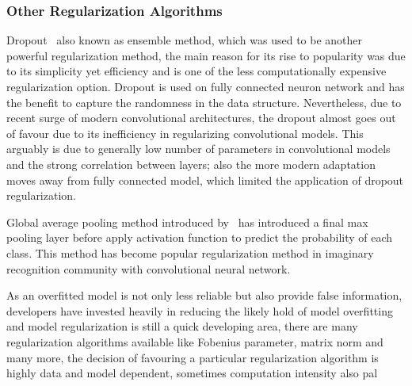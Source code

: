 \subsubsection{Other Regularization Algorithms}

Dropout~\cite{JMLR:v15:srivastava14a} also known as ensemble method, which was used to be another powerful regularization method, the main reason for its rise to popularity was due to its simplicity yet efficiency and is one of the less computationally expensive regularization option. Dropout is used on fully connected neuron network and has the benefit to capture the randomness in the data structure. Nevertheless, due to recent surge of modern convolutional architectures, the dropout almost goes out of favour due to its inefficiency in regularizing convolutional models. This arguably is due to generally low number of parameters in convolutional models and the strong correlation between layers; also the more modern adaptation moves away from fully connected model, which limited the application of dropout regularization. 
\par 
Global average pooling method introduced by~\citet{LinCY13} has introduced a final max pooling layer before apply activation function to predict the probability of each class. This method has become popular regularization method in imaginary recognition community with convolutional neural network. 
\par 
As an overfitted model is not only less reliable but also provide false information, developers have invested heavily in reducing the likely hold of model overfitting and model regularization is still a quick developing area, there are many regularization algorithms available like Fobenius parameter, matrix norm and many more, the decision of favouring a particular regularization algorithm is highly data and model dependent, sometimes computation intensity also pal